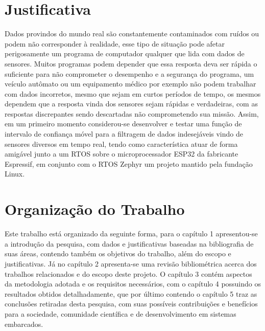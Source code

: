 \section{Justificativa}
Dados provindos do mundo real são constantemente contaminados com ruídos ou podem não corresponder à realidade, esse tipo de situação pode afetar perigosamente um programa de computador qualquer que lida com dados de sensores. Muitos programas podem depender que essa resposta deva ser rápida o suficiente para não comprometer o desempenho e a segurança do programa, um veículo autômato ou um equipamento médico por exemplo não podem trabalhar com dados incorretos, mesmo que sejam em curtos períodos de tempo, os mesmos dependem que a resposta vinda dos sensores sejam rápidas e verdadeiras, com as respostas discrepantes sendo descartadas não comprometendo sua missão. 
Assim, em um primeiro momento considerou-se desenvolver e testar uma função de intervalo de confiança móvel para a filtragem de dados indesejáveis vindo de sensores diversos em tempo real, tendo como característica atuar de forma amigável junto a um RTOS sobre o microprocessador ESP32 da fabricante Espressif, em conjunto com o RTOS Zephyr um projeto mantido pela fundação Linux.


\section{Organização do Trabalho}
Este trabalho está organizado da seguinte forma, para o capítulo 1 apresentou-se a introdução da pesquisa, com dados e justificativas baseadas na bibliografia de suas áreas, contendo também os objetivos do trabalho, além do escopo e justificativas. Já no capítulo 2 apresenta-se uma revisão bibliométrica acerca dos trabalhos relacionados e do escopo deste projeto. O capítulo 3 contém aspectos da metodologia adotada e os requisitos necessários, com o  capítulo 4 
possuindo os resultados obtidos detalhadamente, que por último contendo o capítulo 5 traz as conclusões retiradas desta pesquisa, com suas possíveis contribuições e benefícios para a sociedade, comunidade científica e de desenvolvimento em sistemas embarcados.
 

